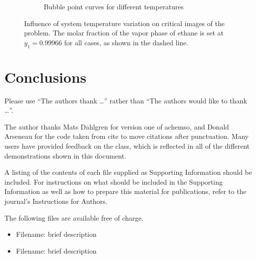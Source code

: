 \documentclass[journal=iecred,manuscript=article]{achemso}
\theoremstyle{definition}
\theoremstyle{remark}
\begin{document}
\begin{figure}
\begin{subfigure}{.5\textwidth}
  \caption{Bubble point curves for different temperatures}
  \label{fig:bubble_curves_temeprature_variation}
\end{subfigure}
\caption{Influence of system temperature variation on critical images of the problem. The molar fraction of the vapor phase of ethane is set at $ y_1 = 0.99966 $ for all cases, as shown in the dashed line.}
\label{fig:domain_image}
\end{figure}

\section{Conclusions}


\begin{acknowledgement}

Please use \enquote{The authors thank \ldots} rather than \enquote{The
authors would like to thank \ldots}.

The author thanks Mats Dahlgren for version one of \textsf{achemso},
and Donald Arseneau for the code taken from \textsf{cite} to move
citations after punctuation. Many users have provided feedback on the
class, which is reflected in all of the different demonstrations
shown in this document.

\end{acknowledgement}

\begin{suppinfo}

A listing of the contents of each file supplied as Supporting Information
should be included. For instructions on what should be included in the
Supporting Information as well as how to prepare this material for
publications, refer to the journal's Instructions for Authors.

The following files are available free of charge.
\begin{itemize}
  \item Filename: brief description
  \item Filename: brief description
\end{itemize}

\end{suppinfo}


\end{document}
